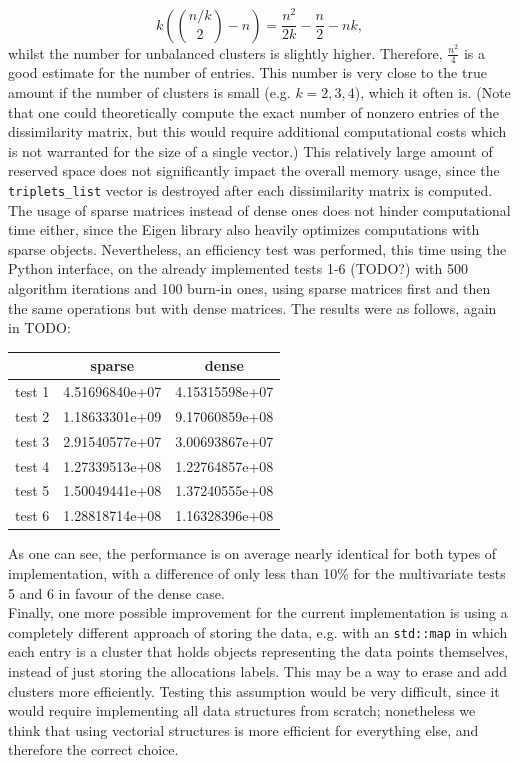 $$ k \left(\binom{n/k}{2} - n\right) = \frac{n^2}{2k} -\frac{n}{2} - nk,$$
whilst the number for unbalanced clusters is slightly higher.
Therefore, $\frac{n^2}{4}$ is a good estimate for the number of entries.
This number is very close to the true amount if the number of clusters is small (e.g. $k=2,3,4$), which it often is. (Note that one could theoretically compute the exact number of nonzero entries of the dissimilarity matrix, but this would require additional computational costs which is not warranted for the size of a single vector.)
This relatively large amount of reserved space does not significantly impact the overall memory usage, since the \verb|triplets_list| vector is destroyed after each dissimilarity matrix is computed. \\
The usage of sparse matrices instead of dense ones does not hinder computational time either, since the Eigen library also heavily optimizes computations with sparse objects.
Nevertheless, an efficiency test was performed, this time using the Python interface, on the already implemented tests 1-6 (TODO?) with 500 algorithm iterations and 100 burn-in ones, using sparse matrices first and then the same operations but with dense matrices.
The results were as follows, again in TODO:
\begin{center}
	\begin{tabular}{c|c|c}
       &      sparse    &      dense     \\ \hline
test 1 & 4.51696840e+07 & 4.15315598e+07 \\
test 2 & 1.18633301e+09 & 9.17060859e+08 \\
test 3 & 2.91540577e+07 & 3.00693867e+07 \\
test 4 & 1.27339513e+08 & 1.22764857e+08 \\
test 5 & 1.50049441e+08 & 1.37240555e+08 \\
test 6 & 1.28818714e+08 & 1.16328396e+08
	\end{tabular}
\end{center}
As one can see, the performance is on average nearly identical for both types of implementation, with a difference of only less than 10\% for the multivariate tests 5 and 6 in favour of the dense case. \\
Finally, one more possible improvement for the current implementation is using a completely different approach of storing the data, e.g. with an \verb|std::map| in which each entry is a cluster that holds objects representing the data points themselves, instead of just storing the allocations labels.
This may be a way to erase and add clusters more efficiently.
Testing this assumption would be very difficult, since it would require implementing all data structures from scratch; nonetheless we think that using vectorial structures is more efficient for everything else, and therefore the correct choice.

